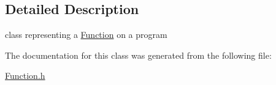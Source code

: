 \subsection{Detailed Description}
class representing a \hyperlink{class_function}{Function} on a program 

The documentation for this class was generated from the following file\-:\begin{DoxyCompactItemize}
\item 
\hyperlink{_function_8h}{Function.\-h}\end{DoxyCompactItemize}
